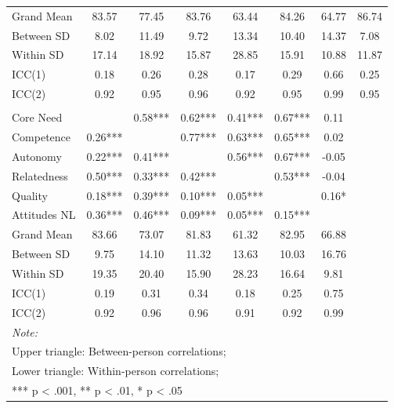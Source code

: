 \begin{table}
\begin{minipage}[t][\textheight][t]{\textwidth}
{\begin{tabular}[t]{lccccccc}
\addlinespace
\hspace{1em}Grand Mean & 83.57 & 77.45 & 83.76 & 63.44 & 84.26 & 64.77 & 86.74\\
\hspace{1em}Between SD & 8.02 & 11.49 & 9.72 & 13.34 & 10.40 & 14.37 & 7.08\\
\hspace{1em}Within SD & 17.14 & 18.92 & 15.87 & 28.85 & 15.91 & 10.88 & 11.87\\
\hspace{1em}ICC(1) & 0.18 & 0.26 & 0.28 & 0.17 & 0.29 & 0.66 & 0.25\\
\hspace{1em}ICC(2) & 0.92 & 0.95 & 0.96 & 0.92 & 0.95 & 0.99 & 0.95\\
\addlinespace[0.3em]
\multicolumn{8}{l}{\textbf{Across Studies}}\\
\hspace{1em}Core Need &  & 0.58*** & 0.62*** & 0.41*** & 0.67*** & 0.11 & \\
\hspace{1em}Competence & 0.26*** &  & 0.77*** & 0.63*** & 0.65*** & 0.02 & \\
\hspace{1em}Autonomy & 0.22*** & 0.41*** &  & 0.56*** & 0.67*** & -0.05 & \\
\hspace{1em}Relatedness & 0.50*** & 0.33*** & 0.42*** &  & 0.53*** & -0.04 & \\
\hspace{1em}Quality & 0.18*** & 0.39*** & 0.10*** & 0.05*** &  & 0.16* & \\
\hspace{1em}Attitudes NL & 0.36*** & 0.46*** & 0.09*** & 0.05*** & 0.15*** &  & \\
\addlinespace
\hspace{1em}Grand Mean & 83.66 & 73.07 & 81.83 & 61.32 & 82.95 & 66.88 & \\
\hspace{1em}Between SD & 9.75 & 14.10 & 11.32 & 13.63 & 10.03 & 16.76 & \\
\hspace{1em}Within SD & 19.35 & 20.40 & 15.90 & 28.23 & 16.64 & 9.81 & \\
\hspace{1em}ICC(1) & 0.19 & 0.31 & 0.34 & 0.18 & 0.25 & 0.75 & \\
\hspace{1em}ICC(2) & 0.92 & 0.96 & 0.96 & 0.91 & 0.92 & 0.99 & \\
\bottomrule
\multicolumn{8}{l}{\rule{0pt}{1em}\textit{Note: }}\\
\multicolumn{8}{l}{\rule{0pt}{1em}Upper triangle: Between-person correlations;}\\
\multicolumn{8}{l}{\rule{0pt}{1em}Lower triangle: Within-person correlations;}\\
\multicolumn{8}{l}{\rule{0pt}{1em}*** p < .001, ** p < .01,  * p < .05}\\
\end{tabular}}
\end{minipage}
\end{table}
